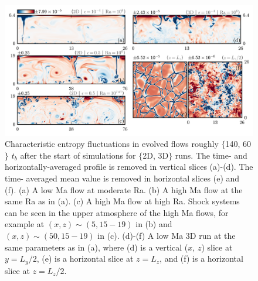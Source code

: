\documentclass[aps, prfluids, onecolumn, notitlepage, nofootinbib, groupedaddress, amsfonts, amssymb, amsmath]{revtex4-1}
\begin{document}
\begin{figure}[t!]
\includegraphics[width=\textwidth]{./figs/snapshots_fig.png}
\caption{Characteristic entropy fluctuations in evolved flows roughly
$\{$140, 60$\}$ $t_b$ after the start of simulations for $\{$2D, 3D$\}$ runs. 
The time- and horizontally-averaged profile is removed in vertical slices (a)-(d). 
The time- averaged mean value is removed in horizontal slices (e) and (f).
(a) A low Ma flow at moderate Ra. (b) A high Ma flow at the same Ra as in (a).
(c) A high Ma flow at high Ra. 
Shock systems can be seen in the upper atmosphere of the high Ma flows,
for example at $(x, z) \sim (5, 15-19)$ in (b) and $(x, z) \sim 
(50, 15-19)$ in (c).
(d)-(f) A low Ma 3D run at the same parameters as in (a),
where (d) is a vertical ($x$, $z$) slice at $y = L_y/2$, (e) is a horizontal slice
at $z = L_z$, and (f) is a horizontal slice at $z = L_z/2$.
\label{fig:entropy_snapshots} }
\end{figure}
\end{document}
